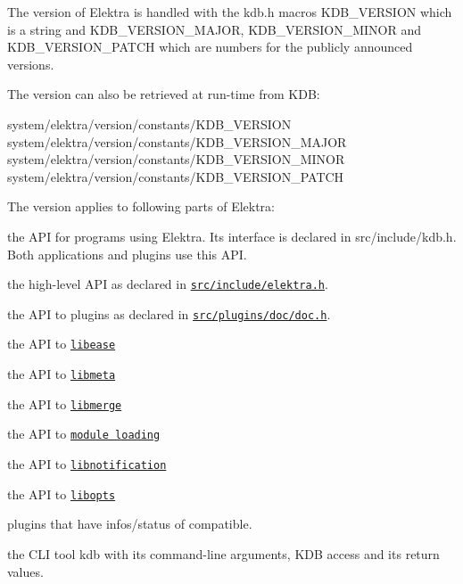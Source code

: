 The version of Elektra is handled with the kdb.\+h macros {\ttfamily K\+D\+B\+\_\+\+V\+E\+R\+S\+I\+ON} which is a string and {\ttfamily K\+D\+B\+\_\+\+V\+E\+R\+S\+I\+O\+N\+\_\+\+M\+A\+J\+OR}, {\ttfamily K\+D\+B\+\_\+\+V\+E\+R\+S\+I\+O\+N\+\_\+\+M\+I\+N\+OR} and {\ttfamily K\+D\+B\+\_\+\+V\+E\+R\+S\+I\+O\+N\+\_\+\+P\+A\+T\+CH} which are numbers for the publicly announced versions.

The version can also be retrieved at run-\/time from K\+DB\+:


\begin{DoxyCode}
system/elektra/version/constants/KDB\_VERSION
system/elektra/version/constants/KDB\_VERSION\_MAJOR
system/elektra/version/constants/KDB\_VERSION\_MINOR
system/elektra/version/constants/KDB\_VERSION\_PATCH
\end{DoxyCode}


The version applies to following parts of Elektra\+:


\begin{DoxyItemize}
\item the A\+PI for programs using Elektra. Its interface is declared in src/include/kdb.h. Both applications and plugins use this A\+PI.
\item the high-\/level A\+PI as declared in \href{/home/jenkins/workspace/libelektra-release/src/include/elektra.h}{\tt src/include/elektra.\+h}.
\item the A\+PI to plugins as declared in \href{/home/jenkins/workspace/libelektra-release/src/plugins/doc/doc.h}{\tt src/plugins/doc/doc.\+h}.
\item the A\+PI to \href{/home/jenkins/workspace/libelektra-release/src/include/kdbease.h}{\tt libease}
\item the A\+PI to \href{/home/jenkins/workspace/libelektra-release/src/include/kdbmeta.h}{\tt libmeta}
\item the A\+PI to \href{/home/jenkins/workspace/libelektra-release/src/include/kdbmerge.h}{\tt libmerge}
\item the A\+PI to \href{/home/jenkins/workspace/libelektra-release/src/include/kdbmodule.h}{\tt module loading}
\item the A\+PI to \href{/home/jenkins/workspace/libelektra-release/src/include/kdbnotification.h}{\tt libnotification}
\item the A\+PI to \href{/home/jenkins/workspace/libelektra-release/src/include/kdbopts.h}{\tt libopts}
\item plugins that have {\ttfamily infos/status} of {\ttfamily compatible}.
\item the C\+LI tool {\ttfamily kdb} with its command-\/line arguments, K\+DB access and its return values.
\end{DoxyItemize}

